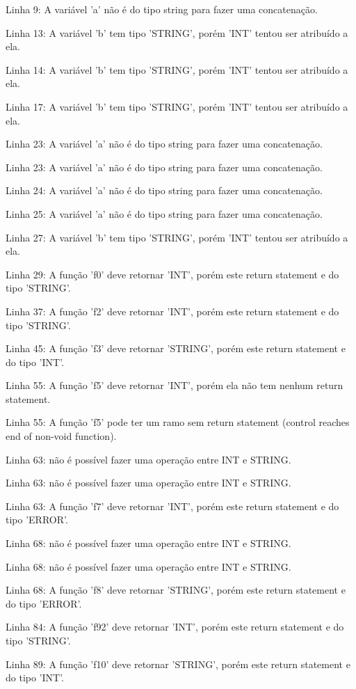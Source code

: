\documentclass[12pt]{article}
\begin{document}
Linha 9: A variável 'a' não é do tipo string para fazer uma concatenação.

Linha 13: A variável 'b' tem tipo 'STRING', porém 'INT' tentou ser atribuído a ela.

Linha 14: A variável 'b' tem tipo 'STRING', porém 'INT' tentou ser atribuído a ela.

Linha 17: A variável 'b' tem tipo 'STRING', porém 'INT' tentou ser atribuído a ela.

Linha 23: A variável 'a' não é do tipo string para fazer uma concatenação.

Linha 23: A variável 'a' não é do tipo string para fazer uma concatenação.

Linha 24: A variável 'a' não é do tipo string para fazer uma concatenação.

Linha 25: A variável 'a' não é do tipo string para fazer uma concatenação.

Linha 27: A variável 'b' tem tipo 'STRING', porém 'INT' tentou ser atribuído a ela.

Linha 29: A função 'f0' deve retornar 'INT', porém este return statement e do tipo 'STRING'.

Linha 37: A função 'f2' deve retornar 'INT', porém este return statement e do tipo 'STRING'.

Linha 45: A função 'f3' deve retornar 'STRING', porém este return statement e do tipo 'INT'.

Linha 55: A função 'f5' deve retornar 'INT', porém ela não tem nenhum return statement.

Linha 55: A função 'f5' pode ter um ramo sem return statement (control reaches end of non-void function).

Linha 63: não é possível fazer uma operação entre INT e STRING.

Linha 63: não é possível fazer uma operação entre INT e STRING.

Linha 63: A função 'f7' deve retornar 'INT', porém este return statement e do tipo 'ERROR'.

Linha 68: não é possível fazer uma operação entre INT e STRING.

Linha 68: não é possível fazer uma operação entre INT e STRING.

Linha 68: A função 'f8' deve retornar 'STRING', porém este return statement e do tipo 'ERROR'.

Linha 84: A função 'f92' deve retornar 'INT', porém este return statement e do tipo 'STRING'.

Linha 89: A função 'f10' deve retornar 'STRING', porém este return statement e do tipo 'INT'.
\end{document}
